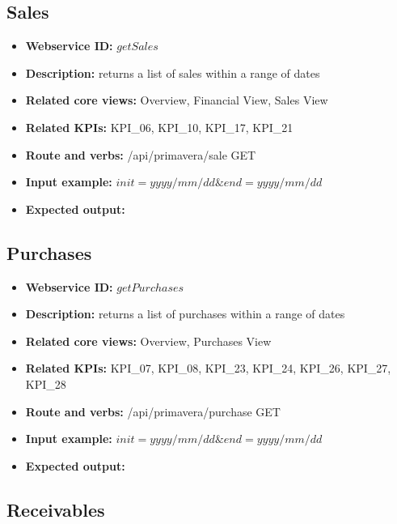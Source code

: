 \documentclass[a4paper]{article}
\begin{document}
\subsection{Sales}

\begin{itemize}
  \item \textbf{Webservice ID:} $getSales$
  \item \textbf{Description:} returns a list of sales within a range of dates
  \item \textbf{Related core views:} Overview, Financial View, Sales View
  \item \textbf{Related KPIs:} KPI\_06, KPI\_10, KPI\_17, KPI\_21
  \item \textbf{Route and verbs:} /api/primavera/sale GET
  \item \textbf{Input example:} $init=yyyy/mm/dd\&end=yyyy/mm/dd$
  \item \textbf{Expected output:} 

  
\end{itemize}


\subsection{Purchases}

\begin{itemize}
  \item \textbf{Webservice ID:} $getPurchases$
  \item \textbf{Description:} returns a list of purchases within a range of dates
  \item \textbf{Related core views:} Overview, Purchases View
  \item \textbf{Related KPIs:} KPI\_07, KPI\_08, KPI\_23, KPI\_24, KPI\_26, KPI\_27, KPI\_28
  \item \textbf{Route and verbs:} /api/primavera/purchase GET
  \item \textbf{Input example:} $init=yyyy/mm/dd\&end=yyyy/mm/dd$
  \item \textbf{Expected output:} 

  
\end{itemize}


\subsection{Receivables}
\end{document}
